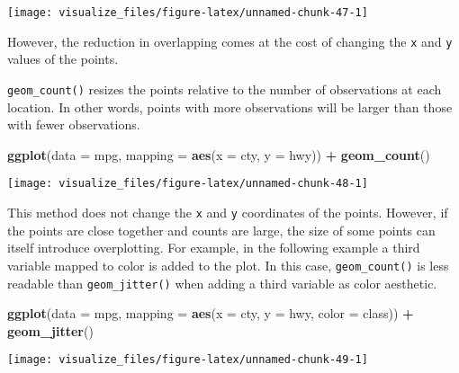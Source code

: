\documentclass[]{book}
\newenvironment{Shaded}{\begin{snugshade}}{\end{snugshade}}
\newcommand{\DataTypeTok}[1]{\textcolor[rgb]{0.13,0.29,0.53}{#1}}
\newcommand{\KeywordTok}[1]{\textcolor[rgb]{0.13,0.29,0.53}{\textbf{#1}}}
\newcommand{\NormalTok}[1]{#1}
\newcommand{\OperatorTok}[1]{\textcolor[rgb]{0.81,0.36,0.00}{\textbf{#1}}}
\newcommand{\StringTok}[1]{\textcolor[rgb]{0.31,0.60,0.02}{#1}}
\theoremstyle{plain}
\theoremstyle{remark}
\begin{document}
\begin{center}\texttt{[image: visualize\_files/figure-latex/unnamed-chunk-47-1]} \end{center}

However, the reduction in overlapping comes at the cost of changing the
\texttt{x} and \texttt{y} values of the points.

\texttt{geom\_count()} resizes the points relative to the number of
observations at each location. In other words, points with more
observations will be larger than those with fewer observations.

\begin{Shaded}
\begin{Highlighting}[]
\KeywordTok{ggplot}\NormalTok{(}\DataTypeTok{data =}\NormalTok{ mpg, }\DataTypeTok{mapping =} \KeywordTok{aes}\NormalTok{(}\DataTypeTok{x =}\NormalTok{ cty, }\DataTypeTok{y =}\NormalTok{ hwy)) }\OperatorTok{+}
\StringTok{  }\KeywordTok{geom_count}\NormalTok{()}
\end{Highlighting}
\end{Shaded}

\begin{center}\texttt{[image: visualize\_files/figure-latex/unnamed-chunk-48-1]} \end{center}

This method does not change the \texttt{x} and \texttt{y} coordinates of
the points. However, if the points are close together and counts are
large, the size of some points can itself introduce overplotting. For
example, in the following example a third variable mapped to color is
added to the plot. In this case, \texttt{geom\_count()} is less readable
than \texttt{geom\_jitter()} when adding a third variable as color
aesthetic.

\begin{Shaded}
\begin{Highlighting}[]
\KeywordTok{ggplot}\NormalTok{(}\DataTypeTok{data =}\NormalTok{ mpg, }\DataTypeTok{mapping =} \KeywordTok{aes}\NormalTok{(}\DataTypeTok{x =}\NormalTok{ cty, }\DataTypeTok{y =}\NormalTok{ hwy, }\DataTypeTok{color =}\NormalTok{ class)) }\OperatorTok{+}
\StringTok{  }\KeywordTok{geom_jitter}\NormalTok{()}
\end{Highlighting}
\end{Shaded}

\begin{center}\texttt{[image: visualize\_files/figure-latex/unnamed-chunk-49-1]} \end{center}
\end{document}
